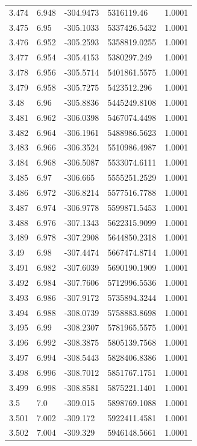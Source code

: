 \begin{tabular}{lllll}
3.474 & 6.948 & -304.9473 & 5316119.46 & 1.0001 \\
3.475 & 6.95 & -305.1033 & 5337426.5432 & 1.0001 \\
3.476 & 6.952 & -305.2593 & 5358819.0255 & 1.0001 \\
3.477 & 6.954 & -305.4153 & 5380297.249 & 1.0001 \\
3.478 & 6.956 & -305.5714 & 5401861.5575 & 1.0001 \\
3.479 & 6.958 & -305.7275 & 5423512.296 & 1.0001 \\
3.48 & 6.96 & -305.8836 & 5445249.8108 & 1.0001 \\
3.481 & 6.962 & -306.0398 & 5467074.4498 & 1.0001 \\
3.482 & 6.964 & -306.1961 & 5488986.5623 & 1.0001 \\
3.483 & 6.966 & -306.3524 & 5510986.4987 & 1.0001 \\
3.484 & 6.968 & -306.5087 & 5533074.6111 & 1.0001 \\
3.485 & 6.97 & -306.665 & 5555251.2529 & 1.0001 \\
3.486 & 6.972 & -306.8214 & 5577516.7788 & 1.0001 \\
3.487 & 6.974 & -306.9778 & 5599871.5453 & 1.0001 \\
3.488 & 6.976 & -307.1343 & 5622315.9099 & 1.0001 \\
3.489 & 6.978 & -307.2908 & 5644850.2318 & 1.0001 \\
3.49 & 6.98 & -307.4474 & 5667474.8714 & 1.0001 \\
3.491 & 6.982 & -307.6039 & 5690190.1909 & 1.0001 \\
3.492 & 6.984 & -307.7606 & 5712996.5536 & 1.0001 \\
3.493 & 6.986 & -307.9172 & 5735894.3244 & 1.0001 \\
3.494 & 6.988 & -308.0739 & 5758883.8698 & 1.0001 \\
3.495 & 6.99 & -308.2307 & 5781965.5575 & 1.0001 \\
3.496 & 6.992 & -308.3875 & 5805139.7568 & 1.0001 \\
3.497 & 6.994 & -308.5443 & 5828406.8386 & 1.0001 \\
3.498 & 6.996 & -308.7012 & 5851767.1751 & 1.0001 \\
3.499 & 6.998 & -308.8581 & 5875221.1401 & 1.0001 \\
3.5 & 7.0 & -309.015 & 5898769.1088 & 1.0001 \\
3.501 & 7.002 & -309.172 & 5922411.4581 & 1.0001 \\
3.502 & 7.004 & -309.329 & 5946148.5661 & 1.0001 \\

\end{tabular}
